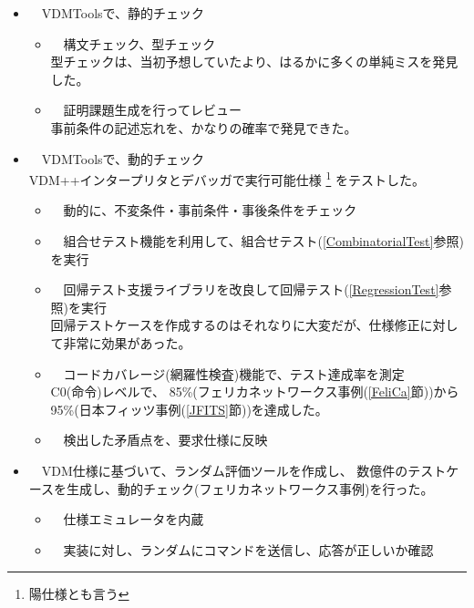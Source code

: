 	\begin{itemize}
	\item　VDMToolsで、静的チェック
		\begin{itemize}
		\item　構文チェック、型チェック \\
			型チェックは、当初予想していたより、はるかに多くの単純ミスを発見した。
		\item　証明課題生成を行ってレビュー \\
			事前条件の記述忘れを、かなりの確率で発見できた。
		\end{itemize} 
	\item　VDMToolsで、動的チェック \\
		VDM++インタープリタとデバッガで実行可能仕様
		\footnote{陽仕様とも言う}
		をテストした。
		\begin{itemize}
		\item　動的に、不変条件・事前条件・事後条件をチェック
		\item　組合せテスト機能を利用して、組合せテスト(\ref{CombinatorialTest}参照)を実行
		\item　回帰テスト支援ライブラリを改良して回帰テスト(\ref{RegressionTest}参照)を実行 \\
				回帰テストケースを作成するのはそれなりに大変だが、仕様修正に対して非常に効果があった。
		\item　コードカバレージ(網羅性検査)機能で、テスト達成率を測定 \\
				C0(命令)レベルで、
				85\%(フェリカネットワークス事例(\ref{FeliCa}節))から95\%(日本フィッツ事例(\ref{JFITS}節))を達成した。
		\item　検出した矛盾点を、要求仕様に反映
		\end{itemize} 
	\item　VDM仕様に基づいて、ランダム評価ツールを作成し、
			数億件のテストケースを生成し、動的チェック(フェリカネットワークス事例)を行った。
		\begin{itemize}
		\item　仕様エミュレータを内蔵
		\item　実装に対し、ランダムにコマンドを送信し、応答が正しいか確認
		\end{itemize} 
	\end{itemize} 

